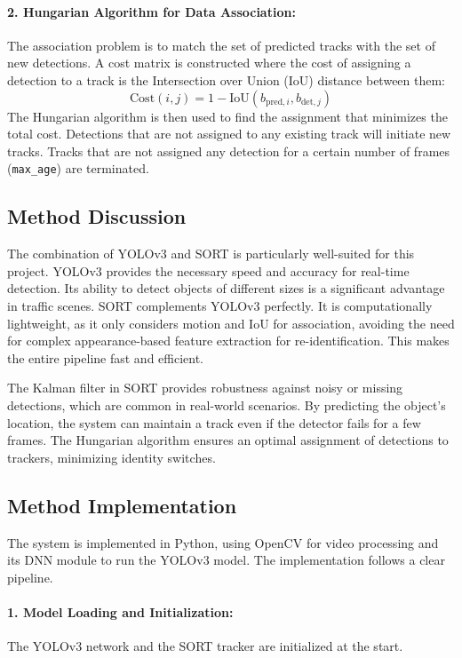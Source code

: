 \documentclass{article}
\begin{document}
\paragraph{2. Hungarian Algorithm for Data Association:}
The association problem is to match the set of predicted tracks with the set of new detections. A cost matrix is constructed where the cost of assigning a detection to a track is the Intersection over Union (IoU) distance between them:
\begin{equation}
\text{Cost}(i, j) = 1 - \text{IoU}(b_{\text{pred},i}, b_{\text{det},j})
\end{equation}
The Hungarian algorithm is then used to find the assignment that minimizes the total cost. Detections that are not assigned to any existing track will initiate new tracks. Tracks that are not assigned any detection for a certain number of frames (\texttt{max\_age}) are terminated.

\subsection{Method Discussion}

The combination of YOLOv3 and SORT is particularly well-suited for this project. YOLOv3 provides the necessary speed and accuracy for real-time detection. Its ability to detect objects of different sizes is a significant advantage in traffic scenes. SORT complements YOLOv3 perfectly. It is computationally lightweight, as it only considers motion and IoU for association, avoiding the need for complex appearance-based feature extraction for re-identification. This makes the entire pipeline fast and efficient.

The Kalman filter in SORT provides robustness against noisy or missing detections, which are common in real-world scenarios. By predicting the object's location, the system can maintain a track even if the detector fails for a few frames. The Hungarian algorithm ensures an optimal assignment of detections to trackers, minimizing identity switches.

\subsection{Method Implementation}

The system is implemented in Python, using OpenCV for video processing and its DNN module to run the YOLOv3 model. The implementation follows a clear pipeline.

\paragraph{1. Model Loading and Initialization:}
The YOLOv3 network and the SORT tracker are initialized at the start.
\end{document}
